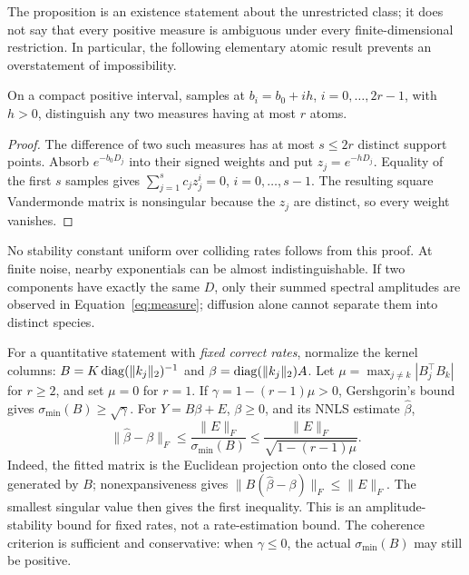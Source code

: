 The proposition is an existence statement about the unrestricted class; it does not say that every positive measure is ambiguous under every finite-dimensional restriction. In particular, the following elementary atomic result prevents an overstatement of impossibility.

\begin{Proposition}\label{prop:atomic}
On a compact positive interval, samples at $b_i=b_0+ih$, $i=0,\ldots,2r-1$, with $h>0$, distinguish any two measures having at most $r$ atoms.
\end{Proposition}
\begin{proof}
The difference of two such measures has at most $s\leq2r$ distinct support points. Absorb $e^{-b_0D_j}$ into their signed weights and put $z_j=e^{-hD_j}$. Equality of the first $s$ samples gives $\sum_{j=1}^s c_j z_j^i=0$, $i=0,\ldots,s-1$. The resulting square Vandermonde matrix is nonsingular because the $z_j$ are distinct, so every weight vanishes.
\end{proof}

No stability constant uniform over colliding rates follows from this proof. At finite noise, nearby exponentials can be almost indistinguishable. If two components have exactly the same $D$, only their summed spectral amplitudes are observed in Equation~\eqref{eq:measure}; diffusion alone cannot separate them into distinct species.

For a quantitative statement with \emph{fixed correct rates}, normalize the kernel columns: $B=K\operatorname{diag}(\|k_j\|_2)^{-1}$ and $\beta=\operatorname{diag}(\|k_j\|_2)A$. Let $\mu=\max_{j\ne k}|B_j^\top B_k|$ for $r\geq2$, and set $\mu=0$ for $r=1$. If $\gamma=1-(r-1)\mu>0$, Gershgorin's bound gives $\sigma_{\min}(B)\geq\sqrt{\gamma}$. For $Y=B\beta+E$, $\beta\geq0$, and its NNLS estimate $\widehat\beta$,
\[
 \|\widehat\beta-\beta\|_F
 \leq\frac{\|E\|_F}{\sigma_{\min}(B)}
 \leq\frac{\|E\|_F}{\sqrt{1-(r-1)\mu}}.
\]
Indeed, the fitted matrix is the Euclidean projection onto the closed cone generated by $B$; nonexpansiveness gives $\|B(\widehat\beta-\beta)\|_F\leq\|E\|_F$. The smallest singular value then gives the first inequality. This is an amplitude-stability bound for fixed rates, not a rate-estimation bound. The coherence criterion is sufficient and conservative: when $\gamma\leq0$, the actual $\sigma_{\min}(B)$ may still be positive.

